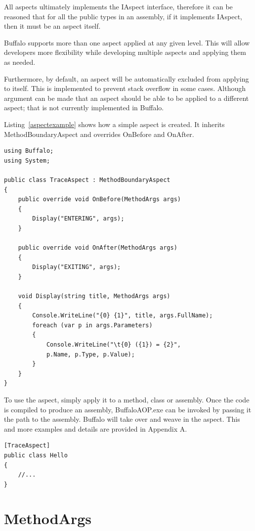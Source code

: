 All aspects ultimately implements the IAspect interface, therefore it can be reasoned that for all the public types in an assembly, if it implements IAspect, then it must be an aspect itself.

Buffalo supports more than one aspect applied at any given level. This will allow developers more flexibility while developing multiple aspects and applying them as needed.

Furthermore, by default, an aspect will be automatically excluded from applying to itself. This is implemented to prevent stack overflow in some cases. Although argument can be made that an aspect should be able to be applied to a different aspect; that is not currently implemented in Buffalo.

Listing~\ref{aspectexample} shows how a simple aspect is created. It inherits MethodBoundaryAspect and overrides OnBefore and OnAfter.

\begin{lstlisting}[caption={Sample TraceAspect}, label=aspectexample]
using Buffalo;
using System;

public class TraceAspect : MethodBoundaryAspect
{
    public override void OnBefore(MethodArgs args)
    {
        Display("ENTERING", args);
    }

    public override void OnAfter(MethodArgs args)
    {
        Display("EXITING", args);
    }

    void Display(string title, MethodArgs args)
    {
        Console.WriteLine("{0} {1}", title, args.FullName);
        foreach (var p in args.Parameters)
        {
            Console.WriteLine("\t{0} ({1}) = {2}", 
			p.Name, p.Type, p.Value);
        }
    }
}
\end{lstlisting}

To use the aspect, simply apply it to a method, class or assembly. Once the code is compiled to produce an assembly, BuffaloAOP.exe can be invoked by passing it the path to the assembly. Buffalo will take over and weave in the aspect. This and more examples and details are provided in Appendix A.

\begin{lstlisting}[caption={Apply Aspect on Class Level}, label=helloaspect]
[TraceAspect]
public class Hello
{
	//...
}
\end{lstlisting}

\section{MethodArgs}

